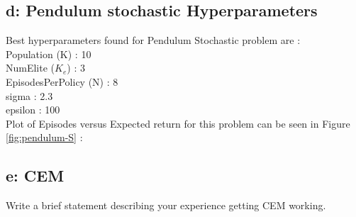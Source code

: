 \documentclass{article}
\begin{document}
\subsection*{d: Pendulum stochastic Hyperparameters} Best hyperparameters found for Pendulum Stochastic problem are : \\
Population (K) : 10 \\
NumElite ($K_e$) : 3 \\
EpisodesPerPolicy (N) : 8 \\
sigma : 2.3 \\
epsilon : 100 \\
Plot of Episodes versus Expected return for this problem can be seen in Figure \ref{fig:pendulum-S} :\\

\subsection*{e: CEM} Write a brief statement describing your experience getting CEM working.
\end{document}
